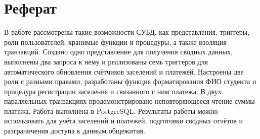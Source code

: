\newpage
\section*{Реферат}

В работе рассмотрены такие возможности СУБД, как представления, триггеры, роли пользователей, хранимые функции и процедуры, а также изоляция транзакций.
Создано одно представление для получения сводных данных, выполнены два запроса к нему и реализованы семь триггеров для автоматического обновления счётчиков заселений и платежей.
Настроены две роли с разными правами, разработаны функция форматирования ФИО студента и процедура регистрации заселения и связанного с ним платежа.
В двух параллельных транзакциях продемонстрировано неповторяющееся чтение суммы платежа.
Работа выполнена в PostgreSQL. Результаты работы можно использовать для учёта заселений и платежей, подготовки сводных отчётов и разграничения доступа к данным общежития.
